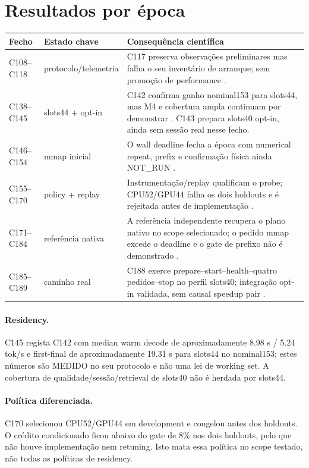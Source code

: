 \section{Resultados por época}
\begin{tabularx}{\linewidth}{@{}p{25mm}p{31mm}Y@{}}
\toprule
\textbf{Fecho} & \textbf{Estado chave} & \textbf{Consequência científica}\\
\midrule
C108--C118 & protocolo/telemetria & C117 preserva observações preliminares mas falha o seu inventário de arranque; sem promoção de performance .\\
C138--C145 & slots44 + opt-in & C142 confirma ganho nominal153 para slots44, mas M4 e cobertura ampla continuam por demonstrar . C143 prepara slots40 opt-in, ainda sem sessão real nesse fecho.\\
C146--C154 & mmap inicial & O wall deadline fecha a época com numerical repeat, prefix e confirmação física ainda NOT\_RUN .\\
C155--C170 & policy + replay & Instrumentação/replay qualificam o probe; CPU52/GPU44 falha os dois holdouts e é rejeitada antes de implementação .\\
C171--C184 & referência nativa & A referência independente recupera o plano nativo no scope selecionado; o pedido mmap excede o deadline e o gate de prefixo não é demonstrado .\\
C185--C189 & caminho real & C188 exerce prepare--start--health--quatro pedidos--stop no perfil slots40; integração opt-in validada, sem causal speedup pair .\\
\bottomrule
\end{tabularx}

\paragraph{Residency.}
C145 regista C142 com median warm decode de aproximadamente 8.98 s / 5.24 tok/s e first-final de aproximadamente 19.31 s para slots44 no nominal153; estes números são MEDIDO no seu protocolo e não uma lei de working set. A cobertura de qualidade/sessão/retrieval de slots40 não é herdada por slots44. 

\paragraph{Política diferenciada.}
C170 selecionou CPU52/GPU44 em development e congelou antes dos holdouts. O crédito condicionado ficou abaixo do gate de 8\% nos dois holdouts, pelo que não houve implementação nem retuning. Isto mata essa política no scope testado, não todas as políticas de residency. 

